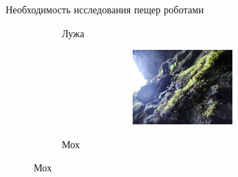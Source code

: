 \documentclass[aspectratio=169,xcolor=table,10pt]{beamer}
\begin{document}
\begin{frame}[t]{Необходимость исследования пещер роботами}
\begin{figure}[H]
\begin{subfigure}[b]{0.3\textwidth}
            \caption*{Лужа}
            \label{fig:surface_types/splash.png}
        \end{subfigure}
        \hfill
        \begin{subfigure}[b]{0.3\textwidth}
            \centering\includegraphics[height=2.8cm,width=1\textwidth,keepaspectratio]{surface_types/moss.jpg}\\
            \caption*{Мох}
            \label{fig:surface_types/moss}
        \end{subfigure}
    \end{figure}
\end{frame}
\end{document}
